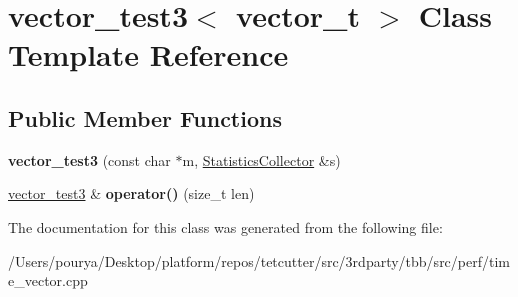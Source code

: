 \hypertarget{classvector__test3}{}\section{vector\+\_\+test3$<$ vector\+\_\+t $>$ Class Template Reference}
\label{classvector__test3}
\subsection*{Public Member Functions}
\begin{DoxyCompactItemize}
\item 
\hypertarget{classvector__test3_a6f25a1b60594b5ba1e3d9646bd03bcea}{}{\bfseries vector\+\_\+test3} (const char $\ast$m, \hyperlink{classStatisticsCollector}{Statistics\+Collector} \&s)\label{classvector__test3_a6f25a1b60594b5ba1e3d9646bd03bcea}

\item 
\hypertarget{classvector__test3_a5e77c44a5a3d1dddd7e766deac42ed70}{}\hyperlink{classvector__test3}{vector\+\_\+test3} \& {\bfseries operator()} (size\+\_\+t len)\label{classvector__test3_a5e77c44a5a3d1dddd7e766deac42ed70}

\end{DoxyCompactItemize}


The documentation for this class was generated from the following file\+:\begin{DoxyCompactItemize}
\item 
/\+Users/pourya/\+Desktop/platform/repos/tetcutter/src/3rdparty/tbb/src/perf/time\+\_\+vector.\+cpp\end{DoxyCompactItemize}

